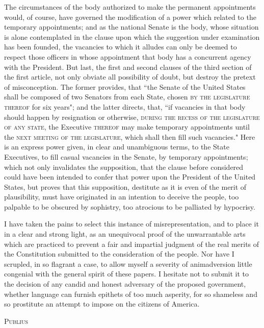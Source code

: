 The circumstances of the body authorized to make the permanent appointments would, of course, have governed the modification of a power which related to the temporary appointments; and as the national Senate is the body, whose situation is alone contemplated in the clause upon which the suggestion under examination has been founded, the vacancies to which it alludes can only be deemed to respect those officers in whose appointment that body has a concurrent agency with the President. 
But last, the first and second clauses of the third section of the first article, not only obviate all possibility of doubt, but destroy the pretext of misconception. 
The former provides, that ``the Senate of the United States shall be composed of two Senators from each State, chosen \textsc{by the legislature thereof} for six years"; and the latter directs, that, ``if vacancies in that body should happen by resignation or otherwise, \textsc{during the recess of the legislature of any state}, the Executive \textsc{thereof} may make temporary appointments until the \textsc{next meeting of the legislature}, which shall then fill such vacancies." Here is an express power given, in clear and unambiguous terms, to the State Executives, to fill casual vacancies in the Senate, by temporary appointments; which not only invalidates the supposition, that the clause before considered could have been intended to confer that power upon the President of the United States, but proves that this supposition, destitute as it is even of the merit of plausibility, must have originated in an intention to deceive the people, too palpable to be obscured by sophistry, too atrocious to be palliated by hypocrisy.

I have taken the pains to select this instance of misrepresentation, and to place it in a clear and strong light, as an unequivocal proof of the unwarrantable arts which are practiced to prevent a fair and impartial judgment of the real merits of the Constitution submitted to the consideration of the people. 
Nor have I scrupled, in so flagrant a case, to allow myself a severity of animadversion little congenial with the general spirit of these papers. 
I hesitate not to submit it to the decision of any candid and honest adversary of the proposed government, whether language can furnish epithets of too much asperity, for so shameless and so prostitute an attempt to impose on the citizens of America.

\vspace{.5cm}
\textsc{Publius}

\vspace{1.5cm}

